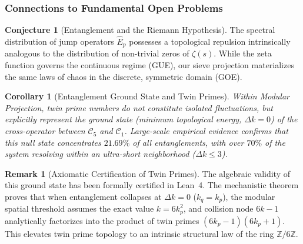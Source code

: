 \documentclass{article}
\numberwithin{equation}{section}
\theoremstyle{plain}
\newtheorem{corollary}[theorem]{Corollary}
\theoremstyle{definition}
\newtheorem{remark}[theorem]{Remark}
\newtheorem{conjecture}[theorem]{Conjecture}
\begin{document}
\subsubsection{Connections to Fundamental Open Problems}

\begin{conjecture}[Entanglement and the Riemann Hypothesis]
The spectral distribution of jump operators $\hat{E}_p$ possesses a topological repulsion intrinsically analogous to the distribution of non-trivial zeros of $\zeta(s)$. While the zeta function governs the continuous regime (GUE), our sieve projection materializes the same laws of chaos in the discrete, symmetric domain (GOE).
\end{conjecture}

\begin{corollary}[Entanglement Ground State and Twin Primes]
\label{cor:estado-fundamental-gemelos}
Within Modular Projection, twin prime numbers do not constitute isolated fluctuations, but explicitly represent the \textit{ground state} (minimum topological energy, $\Delta k = 0$) of the cross-operator between $\mathcal{C}_5$ and $\mathcal{C}_1$. Large-scale empirical evidence confirms that this null state concentrates $21.69\%$ of all entanglements, with over $70\%$ of the system resolving within an ultra-short neighborhood ($\Delta k \le 3$).
\end{corollary}

\begin{remark}[Axiomatic Certification of Twin Primes]
The algebraic validity of this ground state has been formally certified in Lean~4. The mechanistic theorem proves that when entanglement collapses at $\Delta k = 0$ ($k_q = k_p$), the modular spatial threshold assumes the exact value $k = 6k_p^2$, and collision node $6k-1$ analytically factorizes into the product of twin primes $(6k_p-1)(6k_p+1)$. This elevates twin prime topology to an intrinsic structural law of the ring $\mathbb{Z}/6\mathbb{Z}$.
\end{remark}
\end{document}
